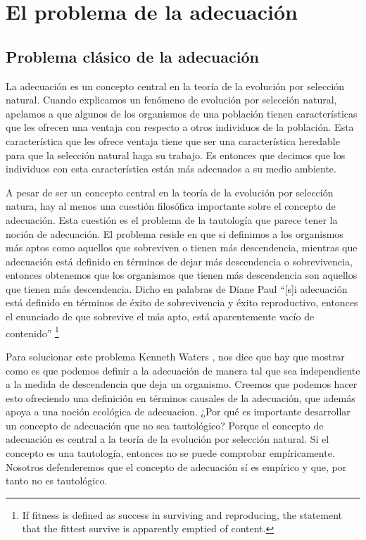 
\chapter{El problema de la adecuación}

\section{Problema clásico de la adecuación}


\noindent La adecuación es un concepto central en la teoría de la evolución por selección natural. Cuando explicamos un fenómeno de evolución por selección natural, apelamos a que algunos de los organismos de una población tienen características que les ofrecen una ventaja con respecto a otros individuos de la población. Esta característica que les ofrece ventaja tiene que ser una característica heredable para que la selección natural haga su trabajo. Es entonces que decimos que los individuos con esta característica están más adecuados a su medio ambiente.

A pesar de ser un concepto central en la teoría de la evolución por selección natura, hay al menos una cuestión filosófica importante sobre el concepto de adecuación. Esta cuestión es el problema de la tautología que parece tener la noción de adecuación. El problema reside en que si definimos a los organismos más aptos como aquellos que sobreviven o tienen más descendencia, mientras que adecuación está definido en términos de dejar más descendencia o sobrevivencia, entonces obtenemos que los organismos que tienen más descendencia son aquellos que tienen más descendencia. Dicho en palabras de Diane Paul ``[s]i adecuación está definido en términos de éxito de sobrevivencia y éxito reproductivo, entonces el enunciado de que sobrevive el más apto, está aparentemente vacío de contenido'' \footnote{If fitness is defined as success in surviving and reproducing, the statement that the fittest survive is apparently emptied of content.} \citeyear{Paul1992}

Para solucionar este problema Kenneth Waters \citeyear{Waters1986}, nos dice que hay que mostrar como es que podemos definir a la adecuación de manera tal que sea independiente a la medida de descendencia que deja un organismo. Creemos que podemos hacer esto ofreciendo una definición en términos causales de la adecuación, que además apoya a una noción ecológica de adecuacion. ¿Por qué es importante desarrollar un concepto de adecuación que no sea tautológico? Porque el concepto de adecuación es central a la teoría de la evolución por selección natural. Si el concepto es una tautología, entonces no se puede comprobar empíricamente. Nosotros defenderemos que el concepto de adecuación sí es empírico y que, por tanto no es tautológico.

